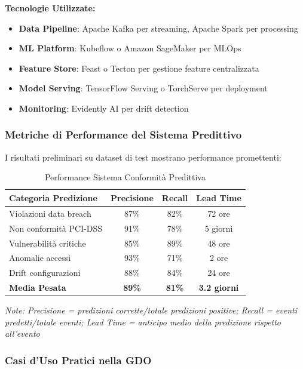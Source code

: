 \textbf{Tecnologie Utilizzate:}
\begin{itemize}
    \item \textbf{Data Pipeline}: Apache Kafka per streaming, Apache Spark per processing
    \item \textbf{ML Platform}: Kubeflow o Amazon SageMaker per MLOps
    \item \textbf{Feature Store}: Feast o Tecton per gestione feature centralizzata
    \item \textbf{Model Serving}: TensorFlow Serving o TorchServe per deployment
    \item \textbf{Monitoring}: Evidently AI per drift detection
\end{itemize}

\subsubsection{Metriche di Performance del Sistema Predittivo}

I risultati preliminari su dataset di test mostrano performance promettenti:

\begin{table}[htbp]
\centering
\caption{Performance Sistema Conformità Predittiva}
\label{tab:predictive_compliance}
\begin{tabular}{|l|c|c|c|}
\hline
\textbf{Categoria Predizione} & \textbf{Precisione} & \textbf{Recall} & \textbf{Lead Time} \\
\hline
Violazioni data breach & 87\% & 82\% & 72 ore \\
Non conformità PCI-DSS & 91\% & 78\% & 5 giorni \\
Vulnerabilità critiche & 85\% & 89\% & 48 ore \\
Anomalie accessi & 93\% & 71\% & 2 ore \\
Drift configurazioni & 88\% & 84\% & 24 ore \\
\hline
\textbf{Media Pesata} & \textbf{89\%} & \textbf{81\%} & \textbf{3.2 giorni} \\
\hline
\end{tabular}
\end{table}

\textit{Note: Precisione = predizioni corrette/totale predizioni positive; Recall = eventi predetti/totale eventi; Lead Time = anticipo medio della predizione rispetto all'evento}

\subsubsection{Casi d'Uso Pratici nella GDO}

